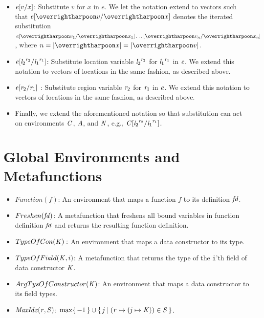 \documentclass[showabstract,showacknowledgments,showpreface,showdedication]{iuphd}
\theoremstyle{nonumberplain}
\newcommand{\il}[1]{\lstinline[style=inline,mathescape=true];#1;}
\begin{document}
\begin{itemize}
\item $\subst{\EXPR}{x}{v}$: Substitute $v$ for $x$ in $e$. We let the notation extend to vectors such that
$\subst{\EXPR}{\overharpoon{x}}{\overharpoon{v}}$ denotes the iterated substitution $\subst{\EXPR}{\overharpoon{x_1}}{\overharpoon{v_1}} \ldots \subst{}{\overharpoon{x_n}}{\overharpoon{v_n}}$, where $n = |\overharpoon{x}| = |\overharpoon{v}|$.

\item $\subst{\EXPR}{\locreg{\loc_1}{\reg_1}}{\locreg{\loc_2}{\reg_2}}$: Substitute location variable $\locreg{\loc_2}{\reg_2}$ for $\locreg{\loc_1}{\reg_1}$ in $\EXPR$. We extend this notation to vectors of locations in the same fashion, as described above.

\item $\subst{\EXPR}{\reg_1}{\reg_2}$ : Substitute region variable $\reg_2$ for $\reg_1$ in $\EXPR$. We extend this notation to vectors of locations in the same fashion, as described above.

\item Finally, we extend the aforementioned notation so that
  substitution can act on environments $\CENV$, $\AENV$, and $\NENV$,
  e.g.,
  $\subst{\CENV}{\locreg{\loc_1}{\reg_1}}{\locreg{\loc_2}{\reg_2}}$.
\end{itemize}


\section{Global Environments and Metafunctions}

\begin{itemize}
\item $Function(f)$: An environment that maps a function $f$ to its definition $\FD$.

\item $Freshen(\FD)$: A metafunction that freshens all bound variables in function definition
$\FD$ and returns the resulting function definition.

\item $TypeOfCon(\DC):$ An environment that maps a data constructor to its type.

\item $TypeOfField(\DC,i)$: A metafunction that returns the type of the \il{i}'th field
of data constructor $\DC$.

\item $ArgTysOfConstructor(\DC)$: An environment that maps a data constructor to its field types.

\item $\allocptr{\reg}{\STOR}$: $\max \set{-1} \cup \set{ \indj \; | \; {(\reg \mapsto (\indj \mapsto \DC)) \in \STOR}}$.
\end{itemize}
\end{document}
